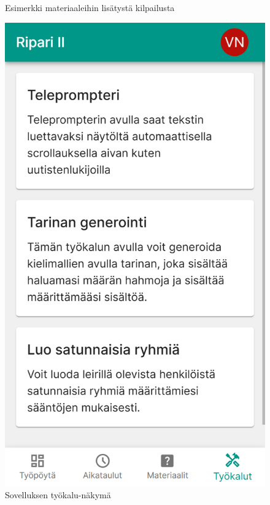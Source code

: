 \begin{figure}[h!]
\begin{minipage}[b]{.3\textwidth}
        \caption{Esimerkki materiaaleihin lisätystä kilpailusta}
        \label{fig:isosapp-materiaalit}
    \end{minipage}\qquad
    \begin{minipage}[b]{.3\textwidth}
        \includegraphics[width=\textwidth]{figures/isosapp-tyokalut.png}
        \caption{Sovelluksen työkalu-näkymä}
        \label{fig:isosapp-tyokalut}
    \end{minipage}
\end{figure}

